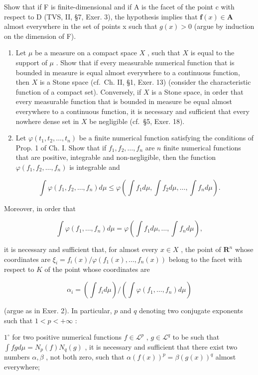 Show that if F is finite-dimensional and if A is the facet of the point c with respect to D (TVS, II, §7, Exer. 3), the hypothesis implies that \(\mathbf{f}(x) \in \mathbf{A}\) almost everywhere in the set of points x such that \(g(x) > 0\) (argue by induction on the dimension of F).

\begin{enumerate}
\def\labelenumi{\arabic{enumi})}
\setcounter{enumi}{2}
\item
  Let \(\mu\) be a measure on a compact space \(X\) , such that \(X\) is equal to the support of \(\mu\) . Show that if every measurable numerical function that is bounded in measure is equal almost everywhere to a continuous function, then \(X\) is a Stone space (cf.~Ch. II, §1, Exer. 13) (consider the characteristic function of a compact set). Conversely, if \(X\) is a Stone space, in order that every measurable function that is bounded in measure be equal almost everywhere to a continuous function, it is necessary and sufficient that every nowhere dense set in \(X\) be negligible (cf.~§5, Exer. 18).
\item
  Let \(\varphi(t_1, t_2, \ldots, t_n)\) be a finite numerical function satisfying the conditions of Prop. 1 of Ch. I. Show that if \(f_1, f_2, \ldots, f_n\) are \(n\) finite numerical functions that are positive, integrable and non-negligible, then the function \(\varphi(f_1, f_2, \ldots, f_n)\) is integrable and
\end{enumerate}

\[
\int \varphi (f _ {1}, f _ {2}, \dots , f _ {n}) d \mu \leqslant \varphi (\int f _ {1} d \mu , \int f _ {2} d \mu , \dots , \int f _ {n} d \mu).
\]

Moreover, in order that

\[
\int \varphi (f _ {1}, \dots , f _ {n}) d \mu = \varphi (\int f _ {1} d \mu , \dots , \int f _ {n} d \mu),
\]

it is necessary and sufficient that, for almost every \(x \in X\) , the point of \(\mathbf{R}^n\) whose coordinates are \(\xi_i = f_i(x) / \varphi(f_1(x), \ldots, f_n(x))\) belong to the facet with respect to \(K\) of the point whose coordinates are

\[
\alpha_ {i} = (\int f _ {i} d \mu) / (\int \varphi (f _ {1}, \dots , f _ {n}) d \mu)
\]

(argue as in Exer. 2). In particular, \(p\) and \(q\) denoting two conjugate exponents such that \(1 < p < +\infty\) :

\(1^{\circ}\) for two positive numerical functions \(f \in \mathcal{L}^{p}\) , \(g \in \mathcal{L}^{q}\) to be such that \(\int fg d\mu = N_{p}(f)N_{q}(g)\) , it is necessary and sufficient that there exist two numbers \(\alpha, \beta\) , not both zero, such that \(\alpha(f(x))^{p} = \beta(g(x))^{q}\) almost everywhere;

